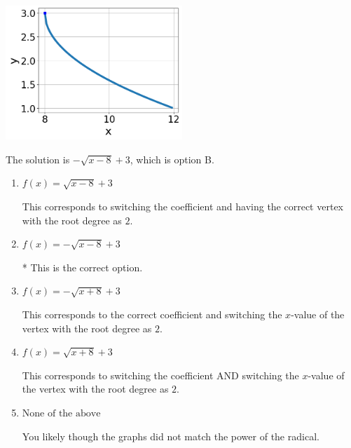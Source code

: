 \documentclass{extbook}[14pt]
\begin{document}
\begin{enumerate}
{\begin{center}
    \includegraphics[width=0.5\textwidth]{../Figures/radicalGraphToEquationCopyA.png}
\end{center}


The solution is \( - \sqrt{x - 8} + 3 \), which is option B.\begin{enumerate}[label=\Alph*.]
\item \( f(x) = \sqrt{x - 8} + 3 \)

This corresponds to switching the coefficient and having the correct vertex with the root degree as $2$.
\item \( f(x) = - \sqrt{x - 8} + 3 \)

* This is the correct option.
\item \( f(x) = - \sqrt{x + 8} + 3 \)

This corresponds to the correct coefficient and switching the $x$-value of the vertex with the root degree as $2$.
\item \( f(x) = \sqrt{x + 8} + 3 \)

This corresponds to switching the coefficient AND switching the $x$-value of the vertex with the root degree as $2$.
\item \( \text{None of the above} \)

You likely though the graphs did not match the power of the radical.
\end{enumerate}

}
\end{enumerate}
\end{document}
